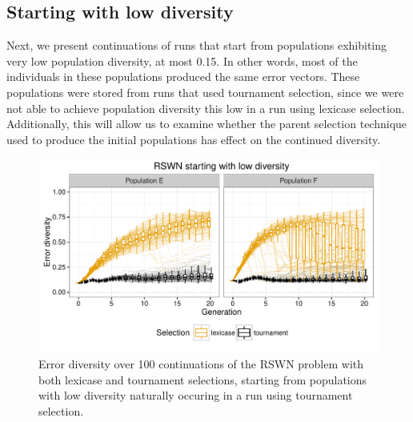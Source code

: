 \documentclass{sig-alternate-05-2015}
\begin{document}


\subsection{Starting with low diversity}
\label{sec:lowDiversityResults}

Next, we present continuations of runs that start from populations exhibiting very low population diversity, at most 0.15. In other words, most of the individuals in these populations produced the same error vectors. These populations were stored from runs that used tournament selection, since we were not able to achieve population diversity this low in a run using lexicase selection. Additionally, this will allow us to examine whether the parent selection technique used to produce the initial populations has effect on the continued diversity.

\begin{figure}
	\includegraphics{../figures/RSWN_low_diversity}
	\vspace{-1 cm}
	\caption{Error diversity over 100 continuations of the RSWN problem with both lexicase and tournament selections, starting from populations with low diversity  naturally occuring in a run using tournament selection.}
	\label{fig:RSWNlowDiversity}
\end{figure}
\end{document}
